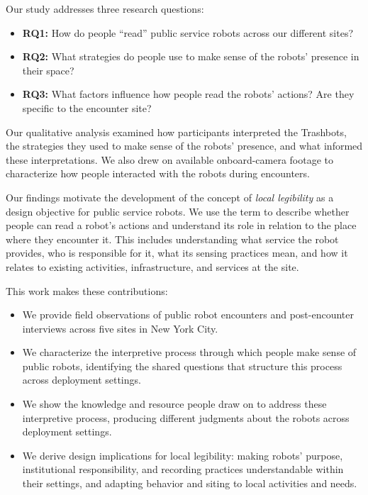 Our study addresses three research questions:


\begin{itemize}

\item \textbf{RQ1:} How do people ``read'' public service robots across our different sites?

\item \textbf{RQ2:} What strategies do people use to make sense of the robots' presence in their space?

\item \textbf{RQ3:} What factors influence how people read the robots' actions? Are they specific to the encounter site?

\end{itemize}

Our qualitative analysis examined how participants interpreted the Trashbots, the strategies they used to make sense of the robots' presence, and what informed these interpretations. We also drew on available onboard-camera footage to  characterize how people interacted with the robots during encounters.


Our findings motivate the development of the concept of \emph{local legibility} as a design objective for public service robots. We use the term to describe whether people can read a robot's actions and understand its role in relation to the place where they encounter it. This includes understanding what service the robot provides, who is responsible for it, what its sensing practices mean, and how it relates to existing activities, infrastructure, and services at the site. 

This work makes these contributions: \begin{itemize}  

\item We provide field observations of public robot encounters and post-encounter interviews
    across five sites in New York City. 
    
    \item We characterize the interpretive process through which people
make sense of public robots, identifying the shared questions
that structure this process across deployment settings. 

\item We show the knowledge and resource people draw on to address these interpretive process, producing different judgments about the robots across deployment settings.

 \item We derive design implications for local legibility: making robots’ purpose, institutional responsibility, and recording practices understandable within their settings, and adapting behavior and siting to local activities and needs.  \end{itemize}